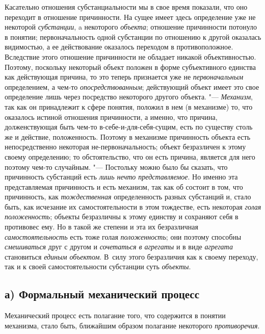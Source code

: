 Касательно отношения субстанциальности мы в свое время
показали, что оно переходит в отношение причинности. На сущее имеет здесь
определение уже не некоторой {\em субстанции}, a некоторого {\em объекта};
отношение причинности потонуло в понятии; первоначальность
одной субстанции по отношению к другой оказалась видимостью, а ее
действование оказалось переходом в противоположное. Вследствие этого
отношение причинности не обладает никакой объективностью. Поэтому,
поскольку некоторый объект положен в форме субъективного единства как
действующая причина, то это теперь признается уже не {\em первоначальным}
определением, а чем-то {\em опосредствованным};
действующий объект имеет это свое определение лишь через
посредство некоторого другого объекта. "--- {\em Механизм}, так как он
принадлежит к сфере понятия, положил в нем (в механизме) то, что оказалось
истиной отношения причинности, а именно, что причина, долженствующая быть
чем-то в-себе-и-для-себя-сущим, есть по существу столь же и действие,
положенность. Поэтому в механизме причинность объекта есть непосредственно
некоторая не-первоначальность; объект безразличен к этому своему
определению; то обстоятельство, что он есть причина, является для него
поэтому чем-то случайным. "--- Постольку можно было бы сказать,
что причинность субстанций есть {\em лишь нечто представляемое}.
Но именно эта представляемая причинность и есть механизм, так
как об состоит в том, что причинность, как {\em тождественная}
определенность разных субстанций и, стало быть, как исчезание
их самостоятельности в этом тождестве, есть некоторая {\em голая положенность};
объекты безразличны к этому единству и сохраняют себя в
противовес ему. Но в такой же степени и эта их безразличная
{\em самостоятельность} есть тоже голая {\em положенность}; они
поэтому способны {\em смешиваться} друг с другом и {\em сочетаться в агрегаты}
и в виде {\em агрегата} становиться {\em единым
объектом}. В~силу этого безразличия как к своему переходу,
так и к своей самостоятельности субстанции суть {\em объекты}.

\subsection[а) Формальный механический процесс]{а) Формальный механический процесс}
Механический процесс есть полагание того, что содержится в понятии механизма,
стало быть, ближайшим образом полагание некоторого {\em противоречия}.


